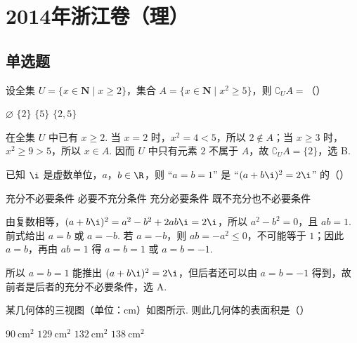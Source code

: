 \chapter{2014年浙江卷（理）}

\section{单选题}

\begin{problem}
设全集 \(U = \{x \in \mathbf{N} \mid x \geqslant 2\}\)，集合 \(A = \{x \in \mathbf{N} \mid x^2 \geqslant 5\}\)，则 \(\complement_U A =\)（\quad）

\choices
    {\(\varnothing\)}
    {\(\{2\}\)}
    {\(\{5\}\)}
    {\(\{2,5\}\)}
\end{problem}

\begin{solution}
在全集 \(U\) 中已有 \(x\geqslant2\). 当 \(x=2\) 时，\(x^2=4<5\)，所以 \(2\notin A\)；当 \(x\geqslant3\) 时，\(x^2\geqslant9>5\)，所以 \(x\in A\). 因而 \(U\) 中只有元素 \(2\) 不属于 \(A\)，故 \(\complement_U A=\{2\}\)，选 B.
\end{solution}

\begin{problem}
已知 \(\i\) 是虚数单位，\(a\)，\(b \in \R\)，则 “\(a = b = 1\)” 是 “\((a + b\i)^2 = 2\i\)” 的（\quad）

\choices
    {充分不必要条件}
    {必要不充分条件}
    {充分必要条件}
    {既不充分也不必要条件}
\end{problem}

\begin{solution}
由复数相等，\((a+b\i)^2=a^2-b^2+2ab\i=2\i\)，所以 \(a^2-b^2=0\)，且 \(ab=1\). 前式给出 \(a=b\) 或 \(a=-b\). 若 \(a=-b\)，则 \(ab=-a^2\leqslant0\)，不可能等于 \(1\)；因此 \(a=b\)，再由 \(ab=1\) 得 \(a=b=1\) 或 \(a=b=-1\).

所以 \(a=b=1\) 能推出 \((a+b\i)^2=2\i\)，但后者还可以由 \(a=b=-1\) 得到，故前者是后者的充分不必要条件，选 A.
\end{solution}

\begin{problem}
某几何体的三视图（单位：\(\mathrm{cm}\)）如图所示. 则此几何体的表面积是（\quad）


\choices
    {\(90 \mathrm{~cm}^{2}\)}
    {\(129 \mathrm{~cm}^{2}\)}
    {\(132 \mathrm{~cm}^{2}\)}
    {\(138 \mathrm{~cm}^{2}\)}
\end{problem}

